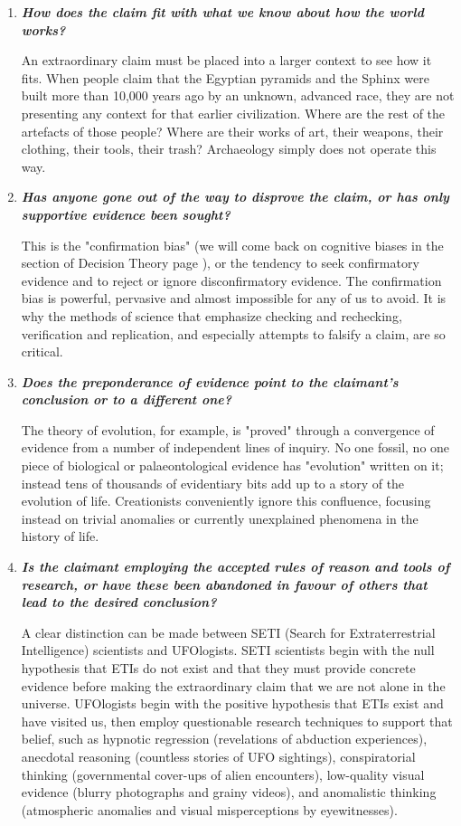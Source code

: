 \begin{enumerate}[label=\protect\circledbullet{\arabic*},leftmargin=15mm]
		\item \textit{\textbf{How does the claim fit with what we know about how the world works?}}

		An extraordinary claim must be placed into a larger context to see how it fits. When people claim that the Egyptian pyramids and the Sphinx were built more than 10,000 years ago by an unknown, advanced race, they are not presenting any context for that earlier civilization. Where are the rest of the artefacts of those people? Where are their works of art, their weapons, their clothing, their tools, their trash? Archaeology simply does not operate this way.

		\item \textit{\textbf{Has anyone gone out of the way to disprove the claim, or has only supportive evidence been sought?}}

		This is the "confirmation bias" (we will come back on cognitive biases in the section of Decision Theory page \pageref{cognitive bias}), or the tendency to seek confirmatory evidence and to reject or ignore disconfirmatory evidence. The confirmation bias is powerful, pervasive and almost impossible for any of us to avoid. It is why the methods of science that emphasize checking and rechecking, verification and replication, and especially attempts to falsify a claim, are so critical. 

		\item \textit{\textbf{Does the preponderance of evidence point to the claimant's conclusion or to a  different one?}}

		The theory of evolution, for example, is "proved" through a convergence of evidence from a number of independent lines of inquiry. No one fossil, no one piece of biological or palaeontological evidence has "evolution" written on it; instead tens of thousands of evidentiary bits add up to a story of the evolution of life. Creationists conveniently ignore this confluence, focusing instead on trivial anomalies or currently unexplained phenomena in the history of life.

		\item \textit{\textbf{Is the claimant employing the accepted rules of reason and tools of research, or have these been abandoned in favour of others that lead to the desired conclusion?}} 

		A clear distinction can be made between SETI (Search for Extraterrestrial Intelligence) scientists and UFOlogists. SETI scientists begin with the null hypothesis that ETIs do not exist and that they must provide concrete evidence before making the extraordinary claim that we are not alone in the universe. UFOlogists begin with the positive hypothesis that ETIs exist and have visited us, then employ questionable research techniques to support that belief, such as hypnotic regression (revelations of abduction experiences), anecdotal reasoning (countless stories of UFO sightings), conspiratorial thinking (governmental cover-ups of alien encounters), low-quality visual evidence (blurry photographs and grainy videos), and anomalistic thinking (atmospheric anomalies and visual misperceptions by eyewitnesses).


\end{enumerate}
